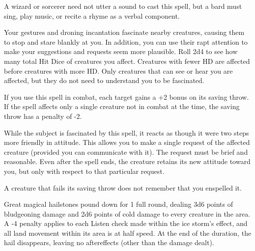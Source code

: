 \begin{multicols}{2}
\begin{small}
\smallskip\noindent A wizard or sorcerer need not utter a sound to cast this spell, but a bard must sing, play music, or recite a rhyme as a verbal component.


\noindent Your gestures and droning incantation fascinate nearby creatures, causing them to stop and stare blankly at you. In addition, you can use their rapt attention to make your suggestions and requests seem more plausible. Roll 2d4 to see how many total Hit Dice of creatures you affect. Creatures with fewer HD are affected before creatures with more HD. Only creatures that can see or hear you are affected, but they do not need to understand you to be fascinated.

\smallskip\noindent If you use this spell in combat, each target gains a +2 bonus on its saving throw. If the spell affects only a single creature not in combat at the time, the saving throw has a penalty of -2.

\smallskip\noindent While the subject is fascinated by this spell, it reacts as though it were two steps more friendly in attitude. This allows you to make a single request of the affected creature (provided you can communicate with it). The request must be brief and reasonable. Even after the spell ends, the creature retains its new attitude toward you, but only with respect to that particular request.

\smallskip\noindent A creature that fails its saving throw does not remember that you enspelled it.

\noindent Great magical hailstones pound down for 1 full round, dealing 3d6 points of bludgeoning damage and 2d6 points of cold damage to every creature in the area. A -4 penalty applies to each Listen check made within the ice storm's effect, and all land movement within its area is at half speed. At the end of the duration, the hail disappears, leaving no aftereffects (other than the damage dealt).


\end{small}
\end{multicols}

